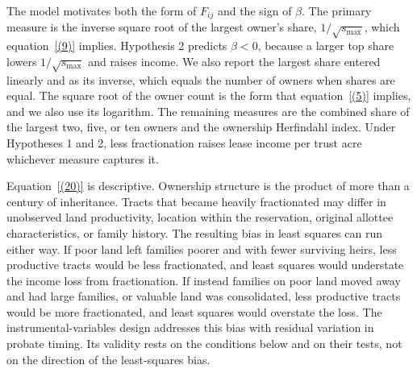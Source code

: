\documentclass[12pt]{article}
\begin{document}
The model motivates both the form of $F_{ij}$ and the sign of $\beta$. The primary measure is the inverse square root of the largest owner's share, $1/\sqrt{s_{\max}}$, which equation~\eqref{(9)} implies. Hypothesis 2 predicts $\beta<0$, because a larger top share lowers $1/\sqrt{s_{\max}}$ and raises income. We also report the largest share entered linearly and as its inverse, which equals the number of owners when shares are equal. The square root of the owner count is the form that equation~\eqref{(5)} implies, and we also use its logarithm. The remaining measures are the combined share of the largest two, five, or ten owners and the ownership Herfindahl index. Under Hypotheses 1 and 2, less fractionation raises lease income per trust acre whichever measure captures it.

Equation~\eqref{(20)} is descriptive. Ownership structure is the product of more than a century of inheritance. Tracts that became heavily fractionated may differ in unobserved land productivity, location within the reservation, original allottee characteristics, or family history. The resulting bias in least squares can run either way. If poor land left families poorer and with fewer surviving heirs, less productive tracts would be less fractionated, and least squares would understate the income loss from fractionation. If instead families on poor land moved away and had large families, or valuable land was consolidated, less productive tracts would be more fractionated, and least squares would overstate the loss. The instrumental-variables design addresses this bias with residual variation in probate timing. Its validity rests on the conditions below and on their tests, not on the direction of the least-squares bias.
\end{document}
